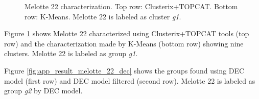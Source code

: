 \documentclass[11pt,a4paper,english,twocolumn]{article}
\begin{document}
\begin{figure}[htbp]
\begin{subfigure}{\columnwidth}
\begin{subfigure}[t]{0.30\textwidth}
    \end{subfigure}
  \end{subfigure}
  \caption{Melotte 22 characterization.
           Top row: Clusterix+TOPCAT. Bottom row: K-Means.
           Melotte 22 is labeled as cluster \emph{g1}.}
  \label{fig:app_result_melotte_22_clusterix_kmeans}
\end{figure}

Figure \ref{fig:app_result_melotte_22_clusterix_kmeans} shows Melotte 22
characterized using Clusterix+TOPCAT tools (top row) and the characterization
made by K-Means (bottom row) showing nine clusters. Melotte 22 is labeled as
group \emph{g1}.

Figure \ref{fig:app_result_melotte_22_dec} shows the groups found using
DEC model (first row) and DEC model filtered (second row).
Melotte 22 is labeled as group \emph{g2} by DEC model.
\end{document}
